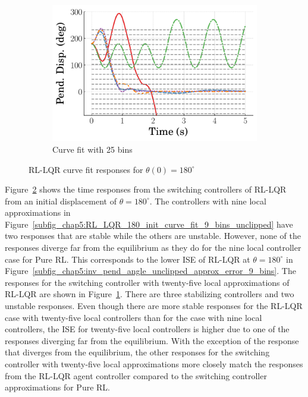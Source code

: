 \begin{figure}
    \hfill
    \begin{subfigure}[b]{0.32\textwidth}
        \centering
        \includegraphics[width=\textwidth]{figures/figures_Interpretability/Mean_ISE_Inverted_Pendulum-v0_cubic_25_bins/Curve_fit_time_responses/lumped_lqr/curve_fit_Pend_Disp_180.pdf}
        \caption{Curve fit with 25 bins}
        \label{subfig_chap5:RL_LQR_180_init_curve_fit_25_bins_unclipped}
    \end{subfigure}
    \hfill
    \caption{RL-LQR curve fit responses for $\theta(0)=180^\circ$}
    \label{fig_chap5:inv_pend_RL_LQR_180_init_unclipped}
\end{figure}
%

Figure~\ref{fig_chap5:inv_pend_RL_LQR_180_init_unclipped} shows the time responses from the switching controllers of RL-LQR from an initial displacement of $\theta=180^\circ$. The controllers with nine local approximations in Figure~\ref{subfig_chap5:RL_LQR_180_init_curve_fit_9_bins_unclipped} have two responses that are stable while the others are unstable. However, none of the responses diverge far from the equilibrium as they do for the nine local controller case for Pure RL. This corresponds to the lower ISE of RL-LQR at $\theta=180^\circ$ in Figure~\ref{subfig_chap5:inv_pend_angle_unclipped_approx_error_9_bins}. The responses for the switching controller with twenty-five local approximations of RL-LQR are shown in Figure~\ref{subfig_chap5:RL_LQR_180_init_curve_fit_25_bins_unclipped}. There are three stabilizing controllers and two unstable responses. Even though there are more stable responses for the RL-LQR case with twenty-five local controllers than for the case with nine local controllers, the ISE for twenty-five local controllers is higher due to one of the responses diverging far from the equilibrium.
%
With the exception of the response that diverges from the equilibrium, the other responses for the switching controller with twenty-five local approximations more closely match the responses from the RL-LQR agent controller compared to the switching controller approximations for Pure RL.

